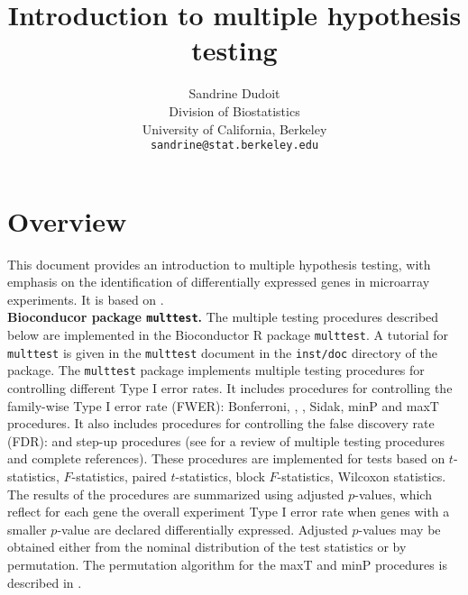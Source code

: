 \documentclass[11pt]{article}
\begin{document}
\title{\bf Introduction to multiple hypothesis testing}
\author{Sandrine Dudoit\\
Division of Biostatistics\\
University of California, Berkeley\\
{\tt sandrine@stat.berkeley.edu}}

\maketitle

\tableofcontents

\section{Overview}

This document provides an introduction to multiple hypothesis testing, with emphasis on the identification of differentially expressed genes in microarray experiments. It is based on \cite{Dudoit&Shaffer02}. \\

{\bf Bioconducor package {\tt multtest}.} The multiple testing procedures described below are implemented in the Bioconductor R package {\tt multtest}. A tutorial for {\tt multtest} is given in the {\tt multtest} document in the {\tt inst/doc} directory of the package. 
The {\tt multtest} package implements multiple testing procedures for controlling different Type I error rates. It includes procedures for controlling the family-wise Type I error rate (FWER): Bonferroni, \cite{Hochberg88}, \cite{Holm79}, Sidak, \cite{Westfall&Young93} minP and maxT procedures. It also includes procedures for controlling the false discovery rate (FDR): \cite{Benjamini&Hochberg95} and \cite{Benjamini&Yekutieli01} step-up procedures (see \cite{Dudoit&Shaffer02} for a review of multiple testing procedures and complete references). These procedures are implemented for tests based on $t$-statistics, $F$-statistics, paired $t$-statistics, block $F$-statistics, Wilcoxon statistics. The results of the procedures are summarized using adjusted $p$-values, which reflect for each gene the overall experiment Type I error rate when genes with a smaller $p$-value are declared differentially expressed. Adjusted $p$-values may be obtained either from the nominal distribution of the test statistics or by permutation. The permutation algorithm for the maxT and minP procedures is described in \cite{Ge&Dudoit}.\\
\end{document}
